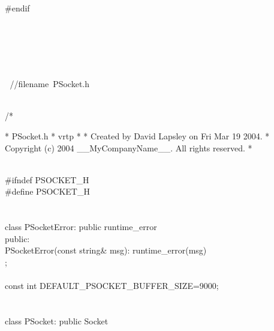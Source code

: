 \documentclass{article}
\begin{document}
\\
 
\\
 #endif
\\
 
\\
 
\\
\strut\\
\strut\goodbreak
{}\strut\nopagebreak\\
 
\hbox{//$$filename PSocket.h}\strut\\
\hbox{/*}

 *  PSocket.h
 *  vrtp
 *
 *  Created by David Lapsley on Fri Mar 19 2004.
 *  Copyright (c) 2004 __MyCompanyName__. All rights reserved.
 *
 \strut\goodbreak
{}\strut\nopagebreak\\
 #ifndef PSOCKET_H
\\
 #define PSOCKET_H
\\
 
\\
 
\\
 class PSocketError: public runtime_error {
\\
 public:
\\
     PSocketError(const string& msg): runtime_error(msg) { }
\\
 };
\\
 
\\
 const int DEFAULT_PSOCKET_BUFFER_SIZE=9000;
\\
 
\\
 
\\
 class PSocket: public Socket 
\\
\end{document}
